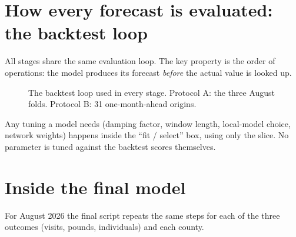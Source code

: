 \documentclass[11pt,letterpaper]{article}
\begin{document}
\section{How every forecast is evaluated: the backtest loop}
All stages share the same evaluation loop. The key property is the order of operations: the model
produces its forecast \emph{before} the actual value is looked up.

\begin{figure}[H]\centering
{}
\caption{The backtest loop used in every stage. Protocol A: the three August folds.
Protocol B: 31 one-month-ahead origins.}\label{fig:loop}
\end{figure}

\noindent Any tuning a model needs (damping factor, window length, local-model choice, network
weights) happens inside the ``fit / select'' box, using only the slice. No parameter is tuned
against the backtest scores themselves.

\section{Inside the final model}
For August 2026 the final script repeats the same steps for each of the three outcomes (visits,
pounds, individuals) and each county.
\end{document}
